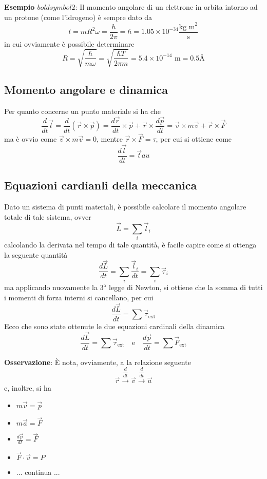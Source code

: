 \documentclass[a4paper]{extarticle}
\begin{document}
\vspace{1em}
\noindent
\textbf{Esempio $boldsymbol{2}$}: Il momento angolare di un elettrone in orbita intorno ad un protone (come l'idrogeno) è sempre dato da
\[l=m R^2 \omega=\frac{h}{2\pi}=\hbar= 1.05 \times 10^{-34} \frac{\text{kg m}^2}{\text{s}}\]
in cui ovviamente è possibile determinare
\[R=\sqrt{\frac{\hbar}{m \omega}}=\sqrt{\frac{\hbar T}{2\pi m}}=5.4 \times 10^{-14} \text{ m} = 0.5 \text{\AA}\]

\vspace{1em}
\subsection{Momento angolare e dinamica}
Per quanto concerne un punto materiale si ha che
\[\frac{d}{dt} \vec l = \frac{d}{dt}(\vec r \times \vec p) = \frac{d \vec r}{dt} \times \vec p + \vec r \times \frac{d \vec p}{dt} = \vec v \times m \vec v + \vec r \times \vec F\]
ma è ovvio come $\vec v \times m \vec v = 0$, mentre $\vec r \times \vec F = \tau$, per cui si ottiene come
\[\frac{d \vec l}{dt}=\vec tau\]

\vspace{1em}
\subsection{Equazioni cardianli della meccanica}
Dato un sistema di punti materiali, è possibile calcolare il momento angolare totale di tale sistema, ovver
\[\vec L = \sum_i \vec l_i\]
calcolando la derivata nel tempo di tale quantità, è facile capire come si ottenga la seguente quantità
\[\frac{d \vec L}{dt} = \sum_i \frac{\vec l_i}{dt} = \sum_i \vec \tau_i\]
ma applicando nuovamente la $3^\text{a}$ legge di Newton, si ottiene che la somma di tutti i momenti di forza interni si cancellano, per cui
\[\frac{d \vec L}{dt} = \sum \vec \tau_{\text{ext}}\]
Ecco che sono state ottenute le due equazioni cardinali della dinamica
\[\boxed{\frac{d \vec L}{dt} = \sum \vec \tau_{\text{ext}}} \hspace{1em} \text{e} \hspace{1em} \boxed{\frac{d \vec p}{dt} = \sum \vec F_{\text{ext}}}\]

\vspace{1em}
\noindent
\textbf{Osservazione}: È nota, ovviamente, a la relazione seguente
\[\vec r \overset{\dfrac{d}{dt}}{\longrightarrow} \vec v \overset{\dfrac{d}{dt}}{\longrightarrow} \vec a\]
e, inoltre, si ha
\begin{itemize}
  \item $m \vec v = \vec p$
  \item $m \vec a = \vec F$
  \item $\frac{d \vec p}{dt} = \vec F$
  \item $\vec F \cdot \vec v = P$
  \item ... continua ...
\end{itemize}
\end{document}
